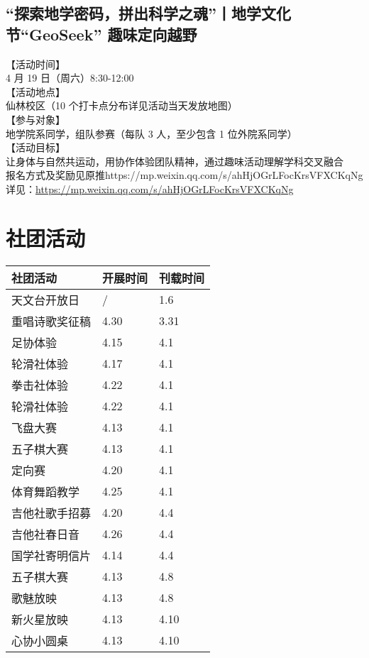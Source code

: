 \documentclass[letterpaper, 12pt]{article}
\begin{document}
\begin{multicols}{2}
\subsection{“探索地学密码，拼出科学之魂”丨地学文化节“GeoSeek” 趣味定向越野}
【活动时间】
\\4 月 19 日（周六）8:30-12:00
\\【活动地点】
\\仙林校区（10 个打卡点分布详见活动当天发放地图）
\\【参与对象】
\\地学院系同学，组队参赛（每队 3 人，至少包含 1 位外院系同学）
\\【活动目标】
\\让身体与自然共运动，用协作体验团队精神，通过趣味活动理解学科交叉融合
\\报名方式及奖励见原推https://mp.weixin.qq.com/s/ahHjOGrLFocKrsVFXCKqNg
\\详见：\url{https://mp.weixin.qq.com/s/ahHjOGrLFocKrsVFXCKqNg}

\section{社团活动}
\begin{tabular}{|>{\centering\arraybackslash}m{}|m{}|m{}|}
    \hline
    社团活动 & 开展时间 & 刊载时间\\
    \hline\hline
    天文台开放日 & / & 1.6\\
    重唱诗歌奖征稿 & 4.30 & 3.31\\
    足协体验 & 4.15 & 4.1\\
    轮滑社体验 & 4.17 & 4.1\\
    拳击社体验 & 4.22 & 4.1\\
    轮滑社体验 & 4.22 & 4.1\\
    飞盘大赛 & 4.13 & 4.1\\
    五子棋大赛 & 4.13 & 4.1\\
    定向赛 & 4.20 & 4.1\\
    体育舞蹈教学 & 4.25 & 4.1\\
    吉他社歌手招募 & 4.20 & 4.4\\
    吉他社春日音 & 4.26 & 4.4\\
    国学社寄明信片 & 4.14 & 4.4\\
    五子棋大赛 & 4.13 & 4.8\\
    歌魅放映 & 4.13 & 4.8\\
    新火星放映 & 4.13 & 4.10\\
    心协小圆桌 & 4.13 & 4.10\\
    \hline
\end{tabular}

\end{multicols}
\end{document}
